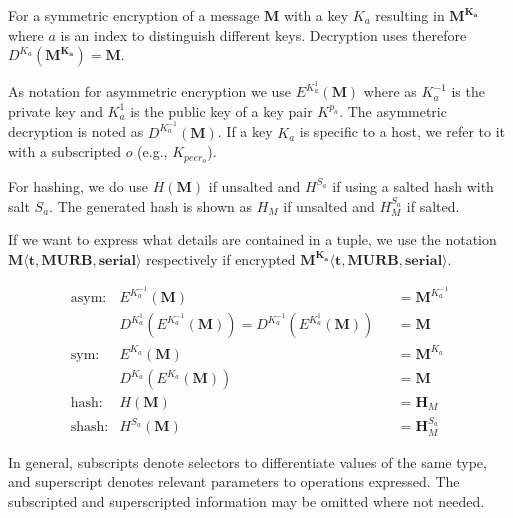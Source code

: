 \documentclass[10pt,journal,compsoc,twocolumn,twoside]{IEEEtran}
\begin{document}
For a symmetric encryption of a message $\mathbf{M}$ with a key $K_a$ resulting in $\mathbf{M^{K_a}}$ where $a$ is an index to distinguish different keys. Decryption uses therefore $D^{K_a}(\mathbf{M^{K_a}})=\mathbf{M}$.

As notation for asymmetric encryption we use $E^{K^{1}_a}(\mathbf{M})$ where as $K^{-1}_a$ is the private key and $K^{1}_a$ is the public key of a key pair $K^{p_a}$. The asymmetric decryption is noted as $D^{K^{-1}_a}(\mathbf{M})$. If a key $K_a$ is specific to a host, we refer to it with a subscripted $o$ (e.g., $K_{peer_o}$).

For hashing, we do use $H(\mathbf{M})$ if unsalted and $H^{S_a}$ if using a salted hash with salt $S_a$. The generated hash is shown as $H_M$ if unsalted and $H^{S_a}_M$ if salted.

If we want to express what details are contained in a tuple, we use the notation $\mathbf{M\langle t,MURB,serial\rangle }$ respectively if encrypted $\mathbf{M^{K_{a}}\langle t,MURB,serial\rangle}$.

\begin{align*}
\text{asym:}         & E^{K^{-1}_a}\left(\mathbf{M}\right)                            && =\mathbf{M}^{K^{-1}_a}\\
                           & D^{K^{1}_a}\left(E^{K^{-1}_a}\left(\mathbf{M}\right)\right) = D^{K^{-1}_a}\left(E^{K^{1}_a}\left(\mathbf{M}\right)\right)    && =\mathbf{M}\\
\text{sym:}          & E^{K_a}\left(\mathbf{M}\right)                                 && =\mathbf{M}^{K_a}\\
& D^{K_a}\left(E^{K_a}\left(\mathbf{M}\right)\right)          && =\mathbf{M}\\
\text{hash:}& H\left(\mathbf{M}\right)                                       && =\mathbf{H}_M\\
\text{shash:}  & H^{S_a}\left(\mathbf{M}\right)                                 && =\mathbf{H}^{S_a}_M
\end{align*}

In general, subscripts denote selectors to differentiate values of the same type, and superscript denotes relevant parameters to operations expressed. The subscripted and superscripted information may be omitted where not needed.
\end{document}

